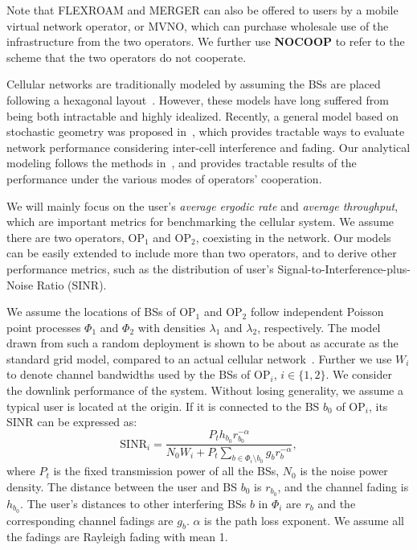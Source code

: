 \documentclass[conference]{IEEEtran}
\begin{document}
Note that FLEXROAM and MERGER can also be offered to users by a mobile virtual network operator, or MVNO, which can purchase wholesale use of the infrastructure from the two operators. We further use \textbf{NOCOOP} to refer to the scheme that the two operators do not cooperate.

Cellular networks are traditionally modeled by assuming the BSs are placed following a hexagonal layout~\cite{Theodore@BOOK02}. However, these models have long suffered from being both intractable and highly idealized. Recently, a general model based on stochastic geometry was proposed in~\cite{Jeffrey@TCOM10}, which provides tractable ways to evaluate network performance considering inter-cell interference and fading. Our analytical modeling follows the methods in~\cite{Jeffrey@TCOM10}, and provides tractable results of the performance under the various modes of operators' cooperation.

We will mainly focus on the user's \textit{average ergodic rate} and \textit{average throughput}, which are important metrics for benchmarking the cellular system. We assume there are two operators, OP$_1$ and OP$_2$, coexisting in the network. Our models can be easily extended to include more than two operators, and to derive other performance metrics, such as the distribution of user's Signal-to-Interference-plus-Noise Ratio (SINR).

We assume the locations of BSs of OP$_1$ and OP$_2$ follow independent Poisson point processes $\Phi_1$ and $\Phi_2$ with densities $\lambda_1$ and $\lambda_2$, respectively. The model drawn from such a random deployment is shown to be about as accurate as the standard grid model, compared to an actual cellular network~\cite{Jeffrey@TCOM10}. Further we use $W_i$ to denote channel bandwidths used by the BSs of OP$_i$, $i \in \{1, 2\}$. We consider the downlink performance of the system. Without losing generality, we assume a typical user is located at the origin. If it is connected to the BS $b_0$ of OP$_i$, its SINR can be expressed as:
\begin{equation}
\textrm{SINR}_{i} = \frac{P_t h_{b_0} r_{b_0}^{-\alpha}}{N_0 W_i + P_t \sum_{b \in \Phi_i \setminus b_0}g_{b} r_{b}^{-\alpha}},
\end{equation}
where $P_t$ is the fixed transmission power of all the BSs, $N_0$ is the noise power density. The distance between the user and BS $b_0$ is $r_{b_0}$, and the channel fading is $h_{b_0}$. The user's distances to other interfering BSs $b$ in $\Phi_i$ are $r_{b}$ and the corresponding channel fadings are $g_{b}$. $\alpha$ is the path loss exponent. We assume all the fadings are Rayleigh fading with mean 1.
\end{document}
